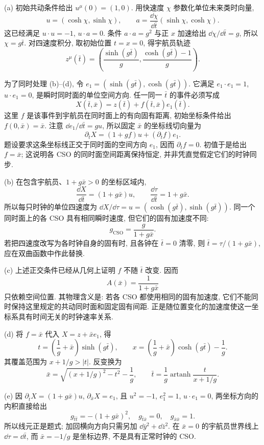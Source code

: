 \begin{solution}
(a) 初始共动条件给出 $u^\mu(0)=(1,0)$. 用快速度 $\chi$ 参数化单位未来类时向量,
\[
 u=(\cosh\chi,\sinh\chi),\qquad
 a=\frac{\dd\chi}{\dd\bar t}(\sinh\chi,\cosh\chi).
\]
这已经满足 $u\cdot u=-1$, $u\cdot a=0$. 条件 $a\cdot a=g^2$ 与正 $x$ 加速给出 $\dd\chi/\dd\bar t=g$, 所以 $\chi=g\bar t$. 对四速度积分, 取初始位置 $t=x=0$, 得宇航员轨迹
\[
 z^\mu(\bar t)=\left(\frac{\sinh(g\bar t)}g,
 \frac{\cosh(g\bar t)-1}g\right).
\]

为了同时处理 (b)--(d), 令 $e_1=(\sinh(g\bar t),\cosh(g\bar t))$. 它满足 $e_1\cdot e_1=1$, $u\cdot e_1=0$, 是瞬时同时面的单位空间方向. 任一同一 $\bar t$ 的事件必须写成
\[
 X(\bar t,\bar x)=z(\bar t)+f(\bar t,\bar x)e_1(\bar t).
\]
这里 $f$ 是该事件到宇航员在同时面上的有向固有距离, 初始坐标条件给出 $f(0,\bar x)=\bar x$. 注意 $\dd e_1/\dd\bar t=gu$, 所以固定 $\bar x$ 的坐标线切向量为
\[
 \partial_{\bar t}X=(1+gf)u+(\partial_{\bar t}f)e_1.
\]
题设要求这条坐标线正交于同时面的空间方向 $e_1$, 因而 $\partial_{\bar t}f=0$. 初值于是给出 $f=\bar x$; 这说明各 CSO 的同时面空间距离保持恒定, 并非凭直觉假定它们的时钟同步.

(b) 在包含宇航员、$1+g\bar x>0$ 的坐标区域内,
\[
 \frac{\dd X}{\dd\bar t}=(1+g\bar x)u,\qquad
 \frac{\dd\tau}{\dd\bar t}=1+g\bar x.
\]
所以每只时钟的单位四速度为 $\dd X/\dd\tau=u=(\cosh(g\bar t),\sinh(g\bar t))$. 同一个同时面上的各 CSO 具有相同瞬时速度, 但它们的固有加速度不同:
\[
 g_{\mathrm{CSO}}=\frac{g}{1+g\bar x}.
\]
若把四速度改写为各时钟自身的固有时, 且各钟在 $\bar t=0$ 清零, 则 $\bar t=\tau/(1+g\bar x)$, 应在双曲函数中作此替换.

(c) 上述正交条件已经从几何上证明 $f$ 不随 $\bar t$ 改变. 因而
\[
 A(\bar x)=\frac1{1+g\bar x}
\]
只依赖空间位置. 其物理含义是: 若各 CSO 都使用相同的固有加速度, 它们不能同时保持这里规定的共动同时面和固定固有间距. 正是随位置变化的加速度使这一坐标系具有时间无关的时钟速率关系.

(d) 将 $f=\bar x$ 代入 $X=z+\bar x e_1$, 得
\[
 t=\left(\frac1g+\bar x\right)\sinh(g\bar t),\qquad
 x=\left(\frac1g+\bar x\right)\cosh(g\bar t)-\frac1g.
\]
其覆盖范围为 $x+1/g>|t|$. 反变换为
\[
 \bar x=\sqrt{(x+1/g)^2-t^2}-\frac1g,\qquad
 \bar t=\frac1g\operatorname{artanh}\frac{t}{x+1/g}.
\]

(e) 因 $\partial_{\bar t}X=(1+g\bar x)u$, $\partial_{\bar x}X=e_1$, 且 $u^2=-1$, $e_1^2=1$, $u\cdot e_1=0$, 两坐标方向的内积直接给出
\[
 g_{\bar t\bar t}=-(1+g\bar x)^2,\quad
 g_{\bar t\bar x}=0,\quad g_{\bar x\bar x}=1.
\]
所以线元正是题式; 加回横向方向只需另加 $\dd\bar y^2+\dd\bar z^2$. 在 $\bar x=0$ 的宇航员世界线上 $\dd\tau=\dd\bar t$, 而 $\bar x=-1/g$ 是坐标边界, 不是具有正常时钟的 CSO.
\end{solution}

